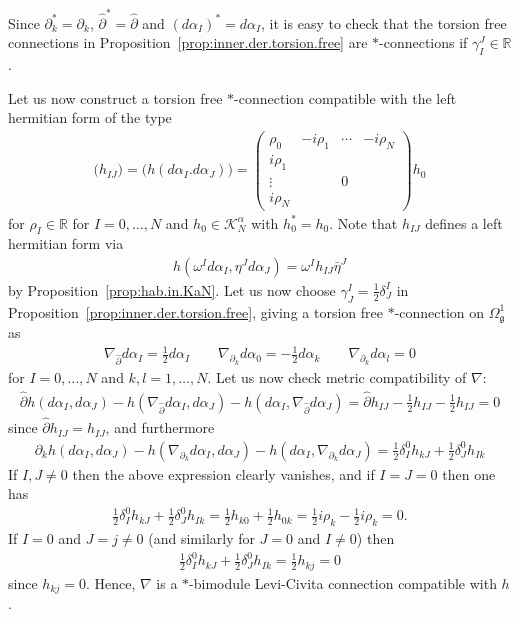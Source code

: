 \documentclass{amsart}
\newcommand{\reals}{\mathbb{R}}
\newcommand{\paraa}[1]{\big(#1\big)}
\theoremstyle{definition}
\theoremstyle{remark}
\numberwithin{equation}{section}
\newcommand{\K}{\mathcal{K}}
\newcommand{\KaN}{\K^\alpha_N}
\renewcommand{\d}{\partial}
\newcommand{\g}{\mathfrak{g}}
\renewcommand{\dh}{\hat{\partial}}
\newcommand{\Omegaoneg}{\Omega^1_{\g}}
\begin{document}
\noindent
Since $\d_k^\ast=\d_k$, $\dh^\ast=\dh$ and
$(d\alpha_I)^\ast=d\alpha_I$, it is easy to check that the torsion
free connections in Proposition~\ref{prop:inner.der.torsion.free} are
$\ast$-connections if $\gamma_I^J\in\reals$.

Let us now construct a torsion free $\ast$-connection compatible with
the left hermitian form of the type
\begin{align*}
  \paraa{h_{IJ}} = \paraa{h(d\alpha_I.d\alpha_J)} =
  \begin{pmatrix}
    \rho_0 & -i\rho_1 & \cdots & -i\rho_N\\
    i\rho_1 & \\
    \vdots & & 0 & \\
    i\rho_N
  \end{pmatrix}h_0
\end{align*}
for $\rho_I\in\reals$ for $I=0,\ldots,N$ and $h_0\in\KaN$ with
$h_0^\ast=h_0$. Note that $h_{IJ}$ defines a left hermitian form via
\begin{align*}
  h(\omega^Id\alpha_I,\eta^J d\alpha_J) =
  \omega^Ih_{IJ}\bar{\eta}^J
\end{align*}
by Proposition~\ref{prop:hab.in.KaN}. Let us now choose
$\gamma^I_J=\tfrac{1}{2}\delta_J^I$ in
Proposition~\ref{prop:inner.der.torsion.free}, giving a
torsion free $\ast$-connection on $\Omegaoneg$ as
\begin{align*}
  \nabla_{\dh}d\alpha_I = \tfrac{1}{2}d\alpha_I\qquad
  \nabla_{\d_k}d\alpha_0 = -\tfrac{1}{2}d\alpha_k\qquad
  \nabla_{\d_k}d\alpha_l = 0
\end{align*}
for $I=0,\ldots,N$ and $k,l=1,\ldots,N$. Let us now check metric compatibility of $\nabla$:
\begin{align*}
  \dh h(d\alpha_I,d\alpha_J) - h(\nabla_{\dh}d\alpha_I,d\alpha_J)-h(d\alpha_I,\nabla_{\dh}d\alpha_J)
  = \dh h_{IJ} -\tfrac{1}{2}h_{IJ}-\tfrac{1}{2}h_{IJ} = 0
\end{align*}
since $\dh h_{IJ} = h_{IJ}$, and furthermore
\begin{align*}
  \d_k h(d\alpha_I,d\alpha_J) - h(\nabla_{\d_k}d\alpha_I,d\alpha_J)-h(d\alpha_I,\nabla_{\d_k}d\alpha_J)
  = \tfrac{1}{2}\delta_I^0h_{kJ} + \tfrac{1}{2}\delta_J^0h_{Ik}
\end{align*}
If $I,J\neq 0$ then the above expression clearly vanishes, and if $I=J=0$ then one has
\begin{align*}
  \tfrac{1}{2}\delta_I^0h_{kJ} + \tfrac{1}{2}\delta_J^0h_{Ik}
  =\tfrac{1}{2}h_{k0} + \tfrac{1}{2}h_{0k}
  =\tfrac{1}{2}i\rho_k -\tfrac{1}{2}i\rho_k = 0. 
\end{align*}
If $I=0$ and $J=j\neq 0$ (and similarly for $J=0$ and $I\neq 0$) then 
\begin{align*}
  \tfrac{1}{2}\delta_I^0h_{kJ} + \tfrac{1}{2}\delta_J^0h_{Ik}
  = \tfrac{1}{2}h_{kj} = 0
\end{align*}
since $h_{kj}=0$. Hence, $\nabla$ is a $\ast$-bimodule Levi-Civita
connection compatible with $h$.
\end{document}
